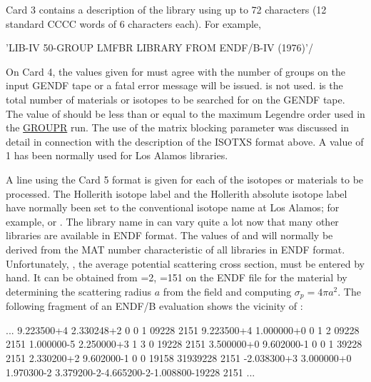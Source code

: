 \noindent
Card 3 contains a description of the library using up to 72
characters (12 standard CCCC words of 6 characters each).  For
example,

\small
\begin{ccode}

  'LIB-IV 50-GROUP LMFBR LIBRARY FROM ENDF/B-IV (1976)'/

\end{ccode}
\normalsize

On Card 4, the values given for  must agree with the
number of groups on the input GENDF tape or a fatal error message
will be issued.   is not used.   is
the total number of materials or isotopes to be searched for on
the GENDF tape.  The value of  should be less than or
equal to the maximum Legendre order used in the
\hyperlink{sGROUPRhy}{GROUPR} run.  The
use of the matrix blocking parameter  was discussed
in detail in connection with the description of the ISOTXS format
above.  A value of 1 has been normally used for Los Alamos libraries.

A line using the Card 5 format is given for each of the 
isotopes or materials to be processed.  The Hollerith isotope label
and the Hollerith absolute isotope label have normally been set
to the conventional isotope name at Los Alamos; for example,
 or .  The library name in 
can vary quite  a lot now that many other libraries are available in
ENDF format.  The values of  and  will
normally be derived from the MAT number characteristic of all
libraries in ENDF format.  Unfortunately, , the
average potential scattering cross section, must be entered by
hand.  It can be obtained from =2, =151 on
the ENDF file for
the material by determining the scattering radius $a$ from the
 field and computing $\sigma_p{=}4\pi a^2$.  The
following fragment of an ENDF/B evaluation shows the vicinity
of :

\small
\begin{ccode}

  ...
 9.223500+4 2.330248+2          0          0          1          09228 2151
 9.223500+4 1.000000+0          0          1          2          09228 2151
 1.000000-5 2.250000+3          1          3          0          19228 2151
 3.500000+0 9.602000-1          0          0          1          39228 2151
 2.330200+2 9.602000-1          0          0      19158       31939228 2151
-2.038300+3 3.000000+0 1.970300-2 3.379200-2-4.665200-2-1.008800-19228 2151
  ...

\end{ccode}
\normalsize

